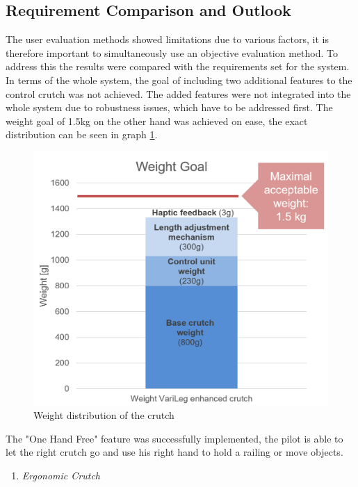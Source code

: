 \documentclass[conference,a4paper]{IEEEtran}
\begin{document}
\subsection{Requirement Comparison and Outlook}
The user evaluation methods showed limitations due to various factors, it is therefore important to simultaneously use an objective evaluation method. To address this the results were compared with the requirements set for the system.
In terms of the whole system, the goal of including two additional features to the control crutch was not achieved. The added features were not integrated into the whole system due to robustness issues, which have to be addressed first.
The weight goal of 1.5kg on the other hand was achieved on ease, the exact distribution can be seen in graph \ref{fig:weightgraph}.
\begin{figure}
    \centering
    \includegraphics[width=1.0\columnwidth]{Images/Discussion/weightgraph.PNG}
    \caption{Weight distribution of the crutch}
    \label{fig:weightgraph}
\end{figure}
The "One Hand Free" feature was successfully implemented, the pilot is able to let the right crutch go and use his right hand to hold a railing or move objects.\\


\begin{enumerate}[\textit{i.}]
    \item {\textit{Ergonomic Crutch}}
\end{enumerate}
\end{document}
